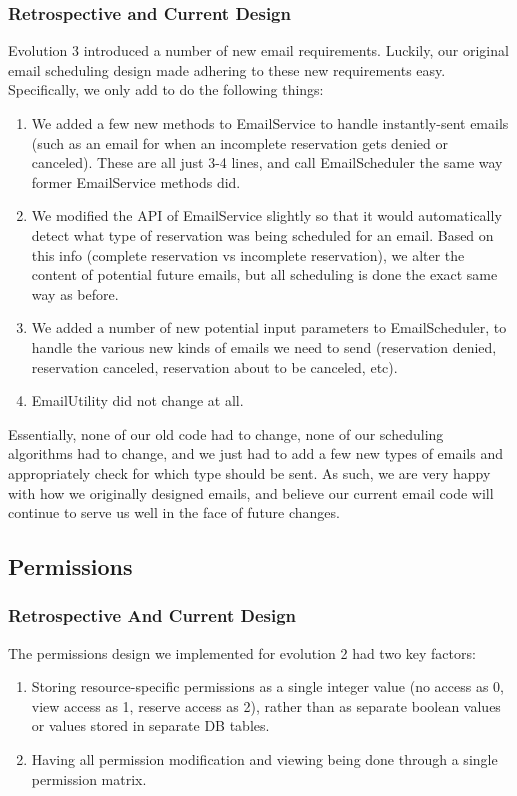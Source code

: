 \documentclass[12pt]{article}
\begin{document}
\subsubsection{Retrospective and Current Design}
Evolution 3 introduced a number of new email requirements. Luckily, our original email scheduling design made adhering to these new requirements easy. Specifically, we only add to do the following things:
\begin{enumerate}
    \item We added a few new methods to EmailService to handle instantly-sent emails (such as an email for when an  incomplete reservation gets denied or canceled). These are all just 3-4 lines, and call EmailScheduler the same way former EmailService methods did. 
    \item We modified the API of EmailService slightly so that it would automatically detect what type of reservation was being scheduled for an email. Based on this info (complete reservation vs incomplete reservation), we alter the content of potential future emails, but all scheduling is done the exact same way as before. 
    \item We added a number of new potential input parameters to EmailScheduler, to handle the various new kinds of emails we need to send (reservation denied, reservation canceled, reservation about to be canceled, etc). 
    \item EmailUtility did not change at all. 
\end{enumerate}

Essentially, none of our old code had to change, none of our scheduling algorithms had to change, and we just had to add a few new types of emails and appropriately check for which type should be sent. As such, we are very happy with how we originally designed emails, and believe our current email code will continue to serve us well in the face of future changes. 


\subsection{Permissions}
\subsubsection{Retrospective And Current Design}
The permissions design we implemented for evolution 2 had two key factors:
\begin{enumerate}
    \item Storing resource-specific permissions as a single integer value (no access as 0, view access as 1, reserve access as 2), rather than as separate boolean values or values stored in separate DB tables. 
    \item Having all permission modification and viewing being done through a single permission matrix. 
\end{enumerate}
\end{document}
